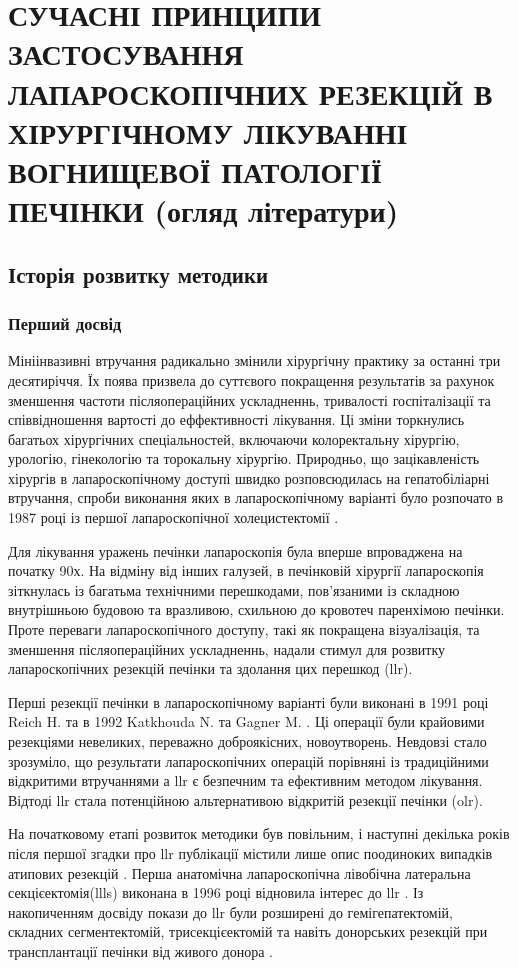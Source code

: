 \chapter {СУЧАСНІ ПРИНЦИПИ ЗАСТОСУВАННЯ ЛАПА\-РО\-СКО\-ПІ\-ЧНИХ РЕЗЕКЦІЙ В ХІРУРГІЧНОМУ ЛІКУВАННІ ВОГНИЩЕВОЇ ПАТОЛОГІЇ ПЕЧІНКИ (огляд літератури)}

\section{Історія розвитку методики}
\subsection{Перший досвід}
Мініінвазивні втручання радикально змінили хірургічну практику за останні три десятиріччя. Їх поява призвела до суттєвого покращення результатів за рахунок зменшення частоти післяопераційних ускладненнь, тривалості госпіталізації та співвідношення вартості до еффективності лікування.  Ці зміни торкнулись багатьох хірургічних спеціальностей, включаючи колоректальну хірургію, урологію, гінекологію та торокальну хірургію. Природньо, що зацікавленість хірургів в лапароскопічному доступі швидко розповсюдилась на гепатобіліарні втручання, спроби виконання яких в лапароскопічному варіанті було розпочато в 1987 році із першої лапароскопічної холецистектомії \cite{Litynski}. 

Для лікування уражень печінки лапароскопія була вперше впроваджена на початку 90х. На відміну від інших галузей, в печінковій хірургії лапароскопія зіткнулась із багатьма технічними перешкодами, пов'язаними із складною внутрішньою будовою та вразливою, схильною до кровотеч паренхімою печінки. Проте переваги лапароскопічного доступу, такі як покращена візуалізація, та зменшення післяопераційних ускладненнь, надали стимул для розвитку лапароскопічних резекцій печінки та здолання цих перешкод (\acrshort{llr}). 

Перші резекції печінки в лапароскопічному варіанті були виконані в 1991 році Reich H. \cite{Reich1991a} та  в 1992 Katkhouda N. \cite{Katkhouda1992} та Gagner M. \cite{GAGNER1992}. Ці операції були крайовими резекціями невеликих, переважно доброякісних, новоутворень. Невдовзі стало зрозуміло, що результати лапароскопічних операцій порівняні із традиційними відкритими втручаннями а \acrshort{llr} є безпечним та ефективним методом лікування. Відтоді \acrshort{llr} стала потенційною альтернативою відкритій резекції печінки (\acrshort{olr}). 

На початковому етапі розвиток методики був повільним, і наступні декілька років після першої згадки про \acrshort{llr} публікації містили лише опис поодиноких випадків атипових резекцій \cite{Klotz1993, Cunningham1995}. Перша анатомічна лапароскопічна лівобічна латеральна секцієектомія(\acrshort{llls}) виконана в 1996 році \cite{Azagra1996}  відновила інтерес до \acrshort{llr}  \cite{Hashizume1995}.  Із накопиченням досвіду покази до \acrshort{llr} були розширені до гемігепатектомій, складних сегментектомій, трисекцієектомій та навіть донорських резекцій при трансплантації печінки від живого донора \cite{Dagher2009, Cherqui2002, Jia2018}. 

